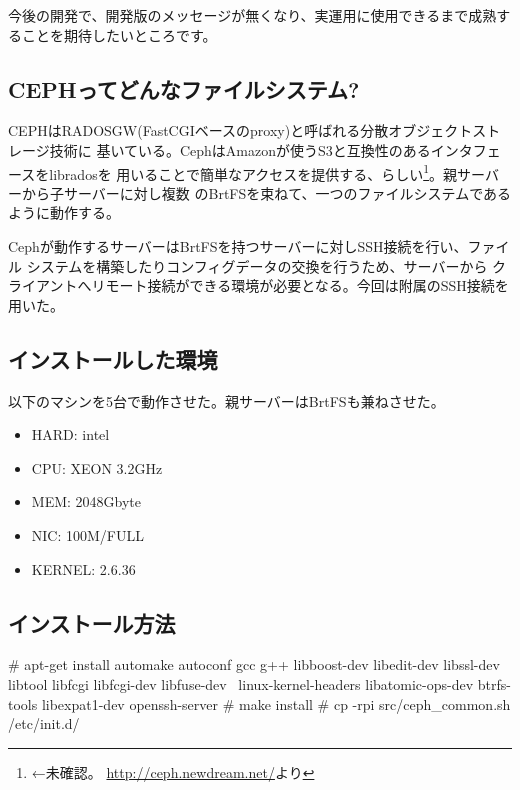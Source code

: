 \documentclass[mingoth,a4paper]{jsarticle}
\begin{document}
今後の開発で、開発版のメッセージが無くなり、実運用に使用できるまで成熟することを期待したいところです。

\subsection{CEPHってどんなファイルシステム?}
CEPHはRADOSGW(FastCGIベースのproxy)と呼ばれる分散オブジェクトストレージ技術に
基いている。CephはAmazonが使うS3と互換性のあるインタフェースをlibradosを
用いることで簡単なアクセスを提供する、らしい\footnote{←未確認。
\url{http://ceph.newdream.net/}より}。親サーバーから子サーバーに対し複数
のBrtFSを束ねて、一つのファイルシステムであるように動作する。

Cephが動作するサーバーはBrtFSを持つサーバーに対しSSH接続を行い、ファイル
システムを構築したりコンフィグデータの交換を行うため、サーバーから
クライアントへリモート接続ができる環境が必要となる。今回は附属のSSH接続を用いた。

\subsection{インストールした環境}
以下のマシンを5台で動作させた。親サーバーはBrtFSも兼ねさせた。
\begin{itemize}
 \item HARD: intel
 \item CPU: XEON 3.2GHz
 \item MEM: 2048Gbyte
 \item NIC: 100M/FULL
 \item KERNEL: 2.6.36
\end{itemize}

\subsection{インストール方法}

\begin{commandline}
# apt-get install automake autoconf gcc g++ libboost-dev libedit-dev libssl-dev libtool libfcgi libfcgi-dev libfuse-dev \
linux-kernel-headers libatomic-ops-dev btrfs-tools libexpat1-dev openssh-server
# make install
# cp -rpi src/ceph_common.sh /etc/init.d/
\end{commandline}
\end{document}
